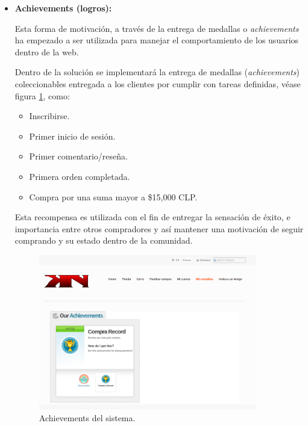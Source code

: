 \begin{itemize}
    \item {\bf Achievements (logros):}

	Esta forma de motivación, a través de la entrega de medallas o \emph{achievements}
	ha empezado a ser utilizada para manejar el comportamiento de los
	usuarios dentro de la web\cite{BehaviorBadges}.

        Dentro de la solución se implementará la entrega de medallas (\emph{achievements})
	coleccionables entregada a los clientes por cumplir con tareas definidas, véase
	figura \ref{fig:achievement}, como:

        \begin{itemize}
            \item Inscribirse.
            \item Primer inicio de sesión.
            \item Primer comentario/reseña.
            \item Primera orden completada.
            \item Compra por una suma mayor a \$15,000 CLP.
        \end{itemize}

        Esta recompensa es utilizada con el fin de entregar la sensación de éxito,
        e importancia entre otros compradores y así mantener una motivación
        de seguir comprando y su estado dentro de la comunidad.

\begin{figure}[!htb]
  \centering
  \includegraphics[width=0.9\textwidth]{images/Tienda/Tienda_achievement.png}
  \caption[Logros del sistema]{Achievements del sistema.}
  \label{fig:achievement}
\end{figure}




\end{itemize}
